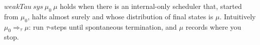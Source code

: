 \begin{definition}
  \label{def:weaktau}
  \leanok
  $weakTau\ sys\ \mu_0\ \mu$ holds when there is an internal-only scheduler that,
  started from $\mu_0$, halts almost surely and whose distribution of final states
  is $\mu$. Intuitively $\mu_0 \Rightarrow_\tau \mu$: run $\tau$-steps until
  spontaneous termination, and $\mu$ records where you stop.
\end{definition}
